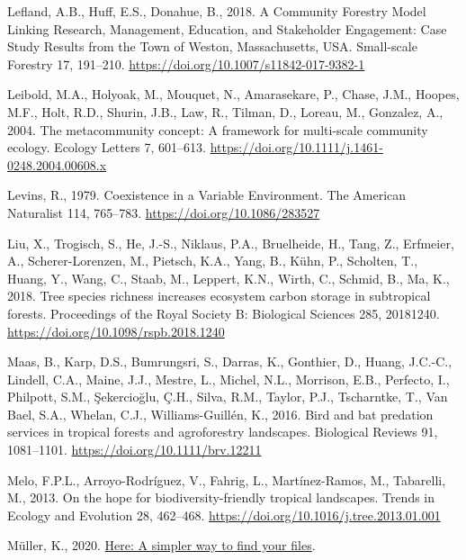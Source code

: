 \documentclass[
  12pt,
]{article}
\newlength{\cslhangindent}
\newlength{\cslentryspacingunit} %
\newenvironment{CSLReferences}[2] %
 {%
  \setlength{\parindent}{0pt}
  \ifodd #1
  \let\oldpar\par
  \def\par{\hangindent=\cslhangindent\oldpar}
  \fi
  \setlength{\parskip}{#2\cslentryspacingunit}
 }%
 {}
\begin{document}
\begin{CSLReferences}{1}{0}
\leavevmode{}%
Lefland, A.B., Huff, E.S., Donahue, B., 2018. A {Community Forestry Model Linking Research}, {Management}, {Education}, and {Stakeholder Engagement}: {Case Study Results} from the {Town} of {Weston}, {Massachusetts}, {USA}. Small-scale Forestry 17, 191--210. \url{https://doi.org/10.1007/s11842-017-9382-1}

\leavevmode{}%
Leibold, M.A., Holyoak, M., Mouquet, N., Amarasekare, P., Chase, J.M., Hoopes, M.F., Holt, R.D., Shurin, J.B., Law, R., Tilman, D., Loreau, M., Gonzalez, A., 2004. The metacommunity concept: {A} framework for multi-scale community ecology. Ecology Letters 7, 601--613. \url{https://doi.org/10.1111/j.1461-0248.2004.00608.x}

\leavevmode{}%
Levins, R., 1979. Coexistence in a {Variable Environment}. The American Naturalist 114, 765--783. \url{https://doi.org/10.1086/283527}

\leavevmode{}%
Liu, X., Trogisch, S., He, J.-S., Niklaus, P.A., Bruelheide, H., Tang, Z., Erfmeier, A., Scherer-Lorenzen, M., Pietsch, K.A., Yang, B., Kühn, P., Scholten, T., Huang, Y., Wang, C., Staab, M., Leppert, K.N., Wirth, C., Schmid, B., Ma, K., 2018. Tree species richness increases ecosystem carbon storage in subtropical forests. Proceedings of the Royal Society B: Biological Sciences 285, 20181240. \url{https://doi.org/10.1098/rspb.2018.1240}

\leavevmode{}%
Maas, B., Karp, D.S., Bumrungsri, S., Darras, K., Gonthier, D., Huang, J.C.-C., Lindell, C.A., Maine, J.J., Mestre, L., Michel, N.L., Morrison, E.B., Perfecto, I., Philpott, S.M., Şekercioğlu, Ç.H., Silva, R.M., Taylor, P.J., Tscharntke, T., Van Bael, S.A., Whelan, C.J., Williams-Guillén, K., 2016. Bird and bat predation services in tropical forests and agroforestry landscapes. Biological Reviews 91, 1081--1101. \url{https://doi.org/10.1111/brv.12211}

\leavevmode{}%
Melo, F.P.L., Arroyo-Rodríguez, V., Fahrig, L., Martínez-Ramos, M., Tabarelli, M., 2013. On the hope for biodiversity-friendly tropical landscapes. Trends in Ecology and Evolution 28, 462--468. \url{https://doi.org/10.1016/j.tree.2013.01.001}

\leavevmode{}%
Müller, K., 2020. \href{https://CRAN.R-project.org/package=here}{Here: A simpler way to find your files}.


\end{CSLReferences}
\end{document}

